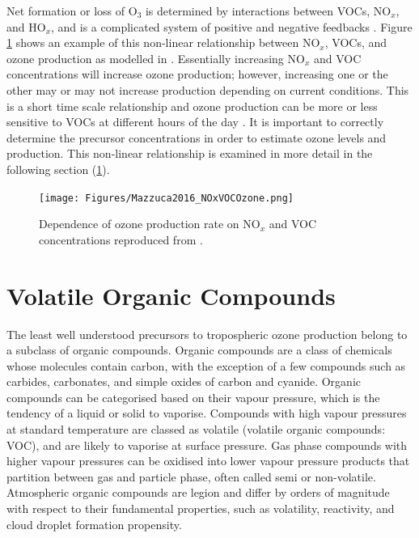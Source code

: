     
    Net formation or loss of O$_3$ is determined by interactions between VOCs, 
    NO$_x$, and HO$_x$, and is a complicated system of positive and negative 
    feedbacks \parencite{Atkinson2000}.
    Figure \ref{LR:VOCs:fig_NOXVOCOzone} shows an example of this non-linear relationship between NO$_x$, VOCs, and ozone production as modelled in \textcite{Mazzuca2016}.
    Essentially increasing NO$_x$ and VOC concentrations will increase ozone production; however, increasing one or the other may or may not increase production depending on current conditions.
    This is a short time scale relationship and ozone production can be more or less sensitive to VOCs at different hours of the day \parencite{Mazzuca2016}.
    It is important to correctly determine the precursor concentrations in 
    order to estimate ozone levels and production.
    This non-linear relationship is examined in more detail in the following section (\ref{LR:VOCs}).
    
    \begin{figure}
      \texttt{[image: Figures/Mazzuca2016\_NOxVOCOzone.png]}
      \caption{Dependence of ozone production rate on NO$_x$ and VOC 
      concentrations reproduced from \textcite{Mazzuca2016}.}
      \label{LR:VOCs:fig_NOXVOCOzone}
    \end{figure}
    
    

\section{Volatile Organic Compounds}
\label{LR:VOCs}

  The least well understood precursors to tropospheric ozone production belong to a subclass of organic compounds.
  Organic compounds are a class of chemicals whose molecules contain carbon, with the exception of a few compounds such as carbides, carbonates, and simple oxides of carbon and cyanide.
  Organic compounds can be categorised based on their vapour pressure, which is the tendency of a liquid or solid to vaporise.
  Compounds with high vapour pressures at standard temperature are classed as volatile (volatile organic compounds: VOC), and are likely to vaporise at surface pressure.
  Gas phase compounds with higher vapour pressures can be oxidised into lower 
  vapour pressure products that partition between gas and particle phase, often 
  called semi or non-volatile. 
  Atmospheric organic compounds are legion and differ by orders of magnitude 
  with respect to their fundamental properties, such as volatility, reactivity, 
  and cloud droplet formation propensity.  
  
